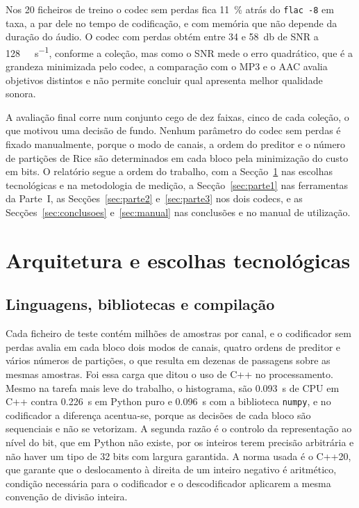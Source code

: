 \documentclass[a4paper,11pt]{article}
\newcommand{\prog}[1]{\texttt{#1}}
\begin{document}
Nos 20 ficheiros de treino o codec sem perdas fica \SI{11}{\percent} atrás do
\prog{flac -8} em taxa, a par dele no tempo de codificação, e com memória que
não depende da duração do áudio. O codec com perdas obtém entre 34 e
\SI{58}{\decibel} de SNR a \SI{128}{\kilo\bit\per\second}, conforme a coleção,
mas como o SNR mede o erro quadrático, que é a grandeza minimizada pelo codec, a
comparação com o MP3 e o AAC avalia objetivos distintos e não permite concluir
qual apresenta melhor qualidade sonora.

A avaliação final corre num conjunto cego de dez faixas, cinco de cada coleção,
o que motivou uma decisão de fundo. Nenhum parâmetro do codec sem perdas é
fixado manualmente, porque o modo de canais, a ordem do preditor e o número de
partições de Rice são determinados em cada bloco pela minimização do custo em
bits. O relatório segue a ordem do trabalho, com a Secção~\ref{sec:arquitetura}
nas escolhas tecnológicas e na metodologia de medição, a
Secção~\ref{sec:parte1} nas ferramentas da Parte~I, as Secções~\ref{sec:parte2}
e~\ref{sec:parte3} nos dois codecs, e as Secções~\ref{sec:conclusoes}
e~\ref{sec:manual} nas conclusões e no manual de utilização.

\section{Arquitetura e escolhas tecnológicas}
\label{sec:arquitetura}
\subsection{Linguagens, bibliotecas e compilação}
Cada ficheiro de teste contém milhões de amostras por canal, e o codificador sem
perdas avalia em cada bloco dois modos de canais, quatro ordens de preditor e
vários números de partições, o que resulta em dezenas de passagens sobre as
mesmas amostras. Foi essa carga que ditou o uso de C++ no processamento. Mesmo
na tarefa mais leve do trabalho, o histograma, são \SI{0,093}{\second} de CPU em
C++ contra \SI{0,226}{\second} em Python puro e \SI{0,096}{\second} com a
biblioteca \prog{numpy}, e no codificador a diferença acentua-se, porque as
decisões de cada bloco são sequenciais e não se vetorizam. A segunda razão é o
controlo da representação ao nível do bit, que em Python não existe, por os
inteiros terem precisão arbitrária e não haver um tipo de 32 bits com largura
garantida. A norma usada é o C++20, que garante que o deslocamento à direita de
um inteiro negativo é aritmético, condição necessária para o codificador e o
descodificador aplicarem a mesma convenção de divisão inteira.
\end{document}
